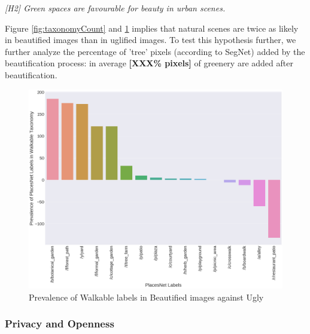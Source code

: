 \par
\textit{[H2] Green spaces are favourable for beauty in urban scenes.  }
\par

Figure \ref{fig:taxonomyCount} and \ref{fig:WalkableTnomy} implies that natural scenes are twice as likely in beautified images than in uglified images. To test this hypothesis further, we further analyze the percentage of 'tree' pixels (according to SegNet) added by the beautification process: in average \textbf{[XXX\% pixels]} of greenery are added after beautification. %

\begin{figure}[h]
	\centering
	\includegraphics[width=\columnwidth]{Plot/walkable_taxonomy.png}
	\caption{Prevalence of Walkable labels in Beautified images against Ugly}
	\label{fig:WalkableTnomy}
\end{figure}




\subsubsection{Privacy and  Openness }
\label{sec:privacy}

